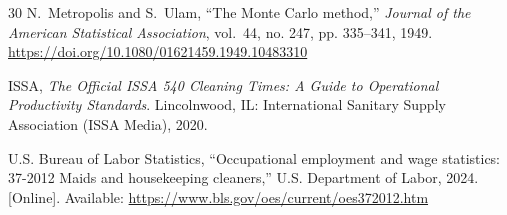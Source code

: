 \documentclass[11pt,a4paper]{article}
\begin{document}
\begin{thebibliography}{30}
N.~Metropolis and S.~Ulam, ``The Monte Carlo method,'' \emph{Journal of the American Statistical Association}, vol.~44, no. 247, pp. 335--341, 1949. \url{https://doi.org/10.1080/01621459.1949.10483310}

ISSA, \emph{The Official ISSA 540 Cleaning Times: A Guide to Operational Productivity Standards}. Lincolnwood, IL: International Sanitary Supply Association (ISSA Media), 2020.

U.S. Bureau of Labor Statistics, ``Occupational employment and wage statistics: 37-2012 Maids and housekeeping cleaners,'' U.S. Department of Labor, 2024. [Online]. Available: \url{https://www.bls.gov/oes/current/oes372012.htm}

\end{thebibliography}
\end{document}
